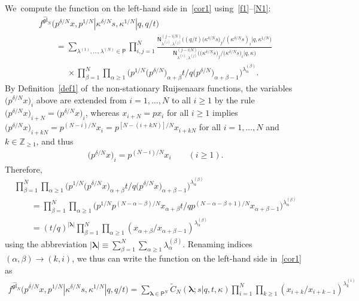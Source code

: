 \documentclass[pdftex]{sigma}%
\numberwithin{equation}{section}
\newcommand{\vlam}{\boldsymbol{\lambda}}
\newcommand{\Z}{{\mathbb Z}}
\begin{document}
We~compute the function on the left-hand side in~\eqref{cor1} using~\eqref{f1}--\eqref{N1}:
\begin{gather*}
f^{\widehat{\mathfrak{gl}}_N}\big(p^{\delta/N} x,p^{1/N}|\kappa^{\delta/N} s,\kappa^{1/N}|q,q/t\big)
\\ \qquad
{}=
\sum_{\lambda^{(1)},\dots,\lambda^{(N)}\in\mathsf{P}} \prod_{i,j=1}^N\frac{\mathsf{N}^{(j-i|N)}_{\lambda^{(i)},\lambda^{(j)}}\big((q/t)\big(\kappa^{\delta/N} s\big)_j/(\kappa^{\delta/N} s)_i|q,\kappa^{1/N}\big)}{\mathsf{N}^{(j-i|N)}_{\lambda^{(i)},\lambda^{(j)}}\big(\big(\kappa^{\delta/N} s\big)_j/\big(\kappa^{\delta/N} s\big)_i|q,\kappa\big)}
\\ \phantom{\qquad=}
{}\times
\prod_{\beta=1}^N\prod_{\alpha\geq 1}\big(p^{1/N}\big(p^{\delta/N}\big)_{\alpha+\beta}t/q
\big(p^{\delta/N}\big)_{\alpha+\beta-1}\big)^{\lambda^{(\beta)}_\alpha}.
\end{gather*}
By Definition~\ref{def1} of~the non-stationary Ruijsenaars functions, the variables $\big(p^{\delta/N} x\big)_i$ above are extended from $i=1,\dots,N$ to all $i\geq 1$ by the rule $\big(p^{\delta/N} x\big)_{i+N}=\big(p^{\delta/N} x\big)_i$, whereas $x_{i+N}=px_i$ for all $i\geq 1$ implies $\big(p^{\delta/N} x\big)_{i+kN}=p^{(N-i)/N}x_i = p^{[N-(i+k N)]/N}x_{i+k N}$ for all $i=1,\dots,N$ and~$k\in\Z_{\geq 1}$, and thus
\begin{gather*}
\big(p^{\delta/N} x\big)_i = p^{(N-i)/N}x_i\qquad (i\geq 1).
\end{gather*}
Therefore,
\begin{gather*}
\prod_{\beta=1}^N\prod_{\alpha\geq 1}\big(p^{1/N}\big(p^{\delta/N} x\big)_{\alpha+\beta}t/q\big(p^{\delta/N} x\big)_{\alpha+\beta-1}\big)^{\lambda^{(\beta)}_\alpha}
\\ \qquad
{}= \prod_{\beta=1}^N\prod_{\alpha\geq 1}\big(p^{1/N}p^{(N-\alpha-\beta)/N}x_{\alpha+\beta}t/q p^{(N-\alpha-\beta+1)/N}x_{\alpha+\beta-1}\big)^{\lambda^{(\beta)}_\alpha}
\\ \qquad
{}= (t/q)^{|\vlam|} \prod_{\beta=1}^N\prod_{\alpha\geq 1}(x_{\alpha+\beta}/x_{\alpha+\beta-1})^{\lambda^{(\beta)}_\alpha}
\end{gather*}
using the abbreviation $|\vlam|\equiv \sum_{\beta=1}^N \sum_{\alpha\geq 1}\lambda^{(\beta)}_\alpha$.
Renaming indices $(\alpha,\beta)\to (k,i)$, we thus can write the function on the left-hand side in~\eqref{cor1} as
\begin{gather*}
f^{\widehat{\mathfrak{gl}}_N}\big(p^{\delta/N} x,p^{1/N}|\kappa^{\delta/N} s,\kappa^{1/N}|q,q/t\big) = \sum_{\vlam\in\mathsf{P}^N} \tilde C_N(\vlam;s|q,t,\kappa)
 \prod_{i=1}^N\prod_{k\geq 1}(x_{i+k}/x_{i+k-1})^{\lambda^{(i)}_k}
\end{gather*}
\end{document}
